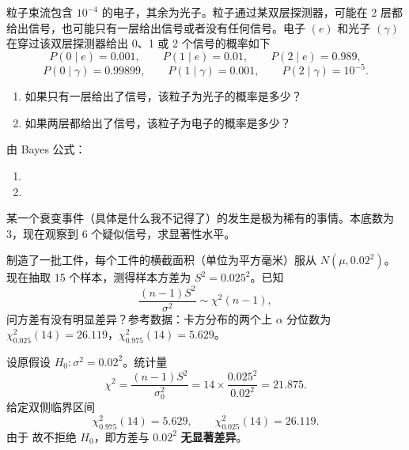 \begin{question}[10 分]
粒子束流包含 $10^{-4}$ 的电子，其余为光子。粒子通过某双层探测器，可能在 2 层都给出信号，也可能只有一层给出信号或者没有任何信号。电子 $(e)$ 和光子 $(\gamma)$ 在穿过该双层探测器给出 0、1 或 2 个信号的概率如下
\[
P(0\mid e)=0.001,\qquad P(1\mid e)=0.01,\qquad P(2\mid e)=0.989,
\]
\[
P(0\mid \gamma)=0.99899,\qquad P(1\mid \gamma)=0.001,\qquad P(2\mid \gamma)=10^{-5}.
\]
\begin{enumerate}
\item 如果只有一层给出了信号，该粒子为光子的概率是多少？
\item 如果两层都给出了信号，该粒子为电子的概率是多少？
\end{enumerate}
\begin{solution}
由 Bayes 公式：
\begin{enumerate}
\item
{}
\item
{}
\end{enumerate}
\end{solution}
\end{question}

\begin{question}[10 分]
某一个衰变事件（具体是什么我不记得了）的发生是极为稀有的事情。本底数为 3，现在观察到 6 个疑似信号，求显著性水平。
\begin{solution}
\end{solution}
\end{question}

\begin{question}[10 分]
制造了一批工件，每个工件的横截面积（单位为平方毫米）服从 $N(\mu,0.02^2)$。现在抽取 15 个样本，测得样本方差为 $S^2=0.025^2$。已知
\[
\frac{(n-1)S^2}{\sigma^2}\sim \chi^2(n-1),
\]
问方差有没有明显差异？参考数据：卡方分布的两个上 $\alpha$ 分位数为 $\chi^2_{0.025}(14)=26.119$，$\chi^2_{0.975}(14)=5.629$。
\begin{solution}
设原假设 $H_0:\sigma^2=0.02^2$。统计量
\[
\chi^2=\frac{(n-1)S^2}{\sigma_0^2}=14\times\frac{0.025^2}{0.02^2}=21.875.
\]
给定双侧临界区间
\[
\chi^2_{0.975}(14)=5.629,\qquad \chi^2_{0.025}(14)=26.119.
\]
由于
故不拒绝 $H_0$，即方差与 $0.02^2$ \textbf{无显著差异}。

\end{solution}
\end{question}

